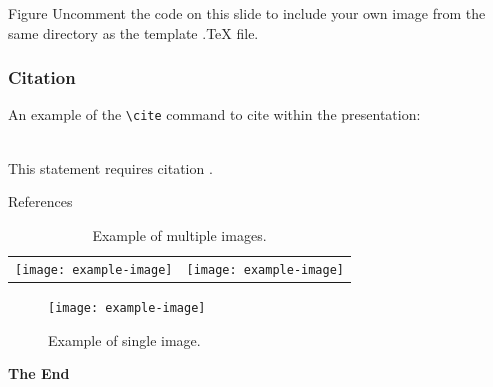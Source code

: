 \documentclass[aspectratio=169,xcolor=dvipsnames]{beamer}
\begin{document}

\begin{frame}{Figure}
    Uncomment the code on this slide to include your own image from the same directory as the template .TeX file.
\end{frame}


\begin{frame}[fragile] %
    \frametitle{Citation}
    An example of the \verb|\cite| command to cite within the presentation:\\~

    This statement requires citation \cite{p1}.
\end{frame}


\begin{frame}{References}

    \begin{table}
        \centering
        \begin{tabular}{cc}
            \texttt{[image: example-image]} &
            \texttt{[image: example-image]} \\
        \end{tabular}
        \caption{Example of multiple images.}
        \label{tab:1}
    \end{table}
\end{frame}


\begin{frame}

    \begin{figure}
        \centering
        \texttt{[image: example-image]}
        \caption{Example of single image.}
        \label{fig:1}
    \end{figure}

    \Huge{\centerline{\textbf{The End}}}
\end{frame}

\end{document}
